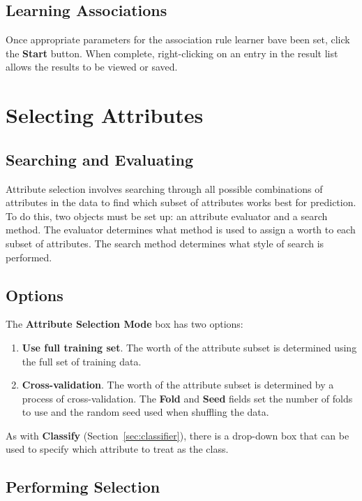 \documentclass[a4paper]{article}
\begin{document}
\subsection{Learning Associations}

Once appropriate parameters for the association rule learner bave been
set, click the \textbf{Start} button.  When complete, right-clicking
on an entry in the result list allows the results to be viewed or
saved.

\section{Selecting Attributes}

\subsection{Searching and Evaluating}

Attribute selection involves searching through all possible combinations of
attributes in the data to find which subset of attributes works best for
prediction.  To do this, two objects must be set up: an attribute evaluator and
a search method.  The evaluator determines what method is used to assign a
worth to each subset of attributes.  The search method determines what style of
search is performed.

\subsection{Options}

The \textbf{Attribute Selection Mode} box has two options:

\begin{enumerate}
\item \textbf{Use full training set}.
The worth of the attribute subset is determined using the full set of training
data. 
\item \textbf{Cross-validation}.
The worth of the attribute subset is determined by a process of
cross-validation.  The \textbf{Fold} and \textbf{Seed} fields set the number of
folds to use and the random seed used when shuffling the data.
\end{enumerate}
\noindent
As with \textbf{Classify} (Section~\ref{sec:classifier}), there is a drop-down
box that can be used to specify which attribute to treat as the class.

\subsection{Performing Selection}
\end{document}
